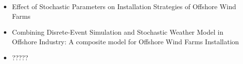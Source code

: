 \begin{titles}
\begin{itemize}
\item Effect of Stochastic Parameters on Installation Strategies of Offshore Wind Farms
\item Combining Disrete-Event Simulation and Stochastic Weather Model in Offshore Industry: A composite model for Offshore Wind Farms Installation
\item ?????
\end{itemize}
\end{titles}